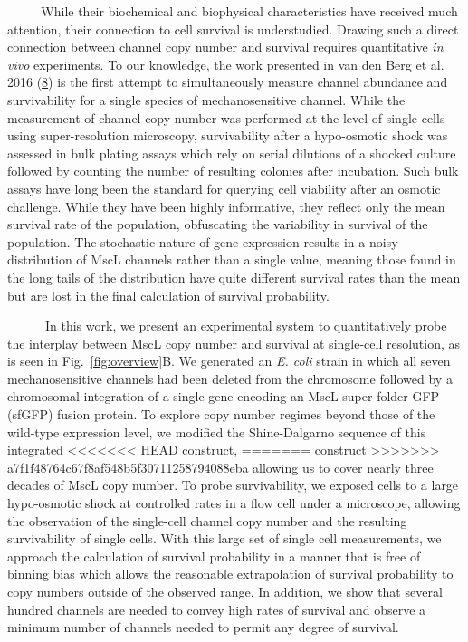 ~~~ ~
While
their
biochemical
and
biophysical
characteristics
have
received
much
attention,
their
connection
to
cell
survival
is
understudied.
Drawing
such a
direct
connection
between
channel
copy
number
and
survival
requires
quantitative
\emph{in
vivo}
experiments.
To our
knowledge,
the
work
presented
in van
den
Berg
et al.
2016
(\protect\hyperlink{ref-vandenberg2016}{8})
is the
first
attempt
to
simultaneously
measure
channel
abundance
and
survivability
for a
single
species
of
mechanosensitive
channel.
While
the
measurement
of
channel
copy
number
was
performed
at the
level
of
single
cells
using
super-resolution
microscopy,
survivability
after
a
hypo-osmotic
shock
was
assessed
in
bulk
plating
assays
which
rely
on
serial
dilutions
of a
shocked
culture
followed
by
counting
the
number
of
resulting
colonies
after
incubation.
Such
bulk
assays
have
long
been
the
standard
for
querying
cell
viability
after
an
osmotic
challenge.
While
they
have
been
highly
informative,
they
reflect
only
the
mean
survival
rate
of the
population,
obfuscating
the
variability
in
survival
of the
population.
The
stochastic
nature
of
gene
expression
results
in a
noisy
distribution
of
MscL
channels
rather
than a
single
value,
meaning
those
found
in the
long
tails
of the
distribution
have
quite
different
survival
rates
than
the
mean
but
are
lost
in the
final
calculation
of
survival
probability.

~ ~ ~
~In
this
work,
we
present
an
experimental
system
to
quantitatively
probe
the
interplay
between
MscL
copy
number
and
survival
at
single-cell
resolution,
as is
seen
in
Fig.~\ref{fig:overview}B.
We
generated
an
\emph{E.
coli}
strain
in
which
all
seven
mechanosensitive
channels
had
been
deleted
from
the
chromosome
followed
by a
chromosomal
integration
of a
single
gene
encoding
an
MscL-super-folder
GFP
(sfGFP)
fusion
protein.
To
explore
copy
number
regimes
beyond
those
of the
wild-type
expression
level,
we
modified
the
Shine-Dalgarno
sequence
of
this
integrated
<<<<<<< HEAD
construct,
=======
construct
>>>>>>> a7f1f48764c67f8af548b5f30711258794088eba
allowing
us to
cover
nearly
three
decades
of
MscL
copy
number.
To
probe
survivability,
we
exposed
cells
to a
large
hypo-osmotic
shock
at
controlled
rates
in a
flow
cell
under
a
microscope,
allowing
the
observation
of the
single-cell
channel
copy
number
and
the
resulting
survivability
of
single
cells.
With
this
large
set of
single
cell
measurements,
we
approach
the
calculation
of
survival
probability
in a
manner
that
is
free
of
binning
bias
which
allows
the
reasonable
extrapolation
of
survival
probability
to
copy
numbers
outside
of the
observed
range.
In
addition,
we
show
that
several
hundred
channels
are
needed
to
convey
high
rates
of
survival
and
observe
a
minimum
number
of
channels
needed
to
permit
any
degree
of
survival.

